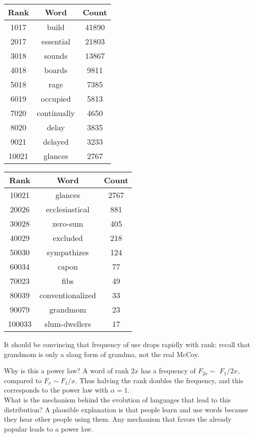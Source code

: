 \documentclass[10pt]{article}
\begin{document}
\begin{center}
\begin{tabular}{c|c|c}
Rank & Word & Count \\
\hline
1017 & build & 41890 \\
2017 & essential & 21803 \\
3018 & sounds & 13867 \\
4018 & boards & 9811 \\
5018 & rage & 7385 \\
6019 & occupied & 5813 \\
7020 & continually & 4650 \\
8020 & delay & 3835 \\
9021 & delayed & 3233 \\
10021 & glances & 2767 \\
\end{tabular}
\end{center}

\begin{center}
\begin{tabular}{c|c|c}
Rank & Word & Count \\
\hline
10021 & glances & 2767 \\
20026 & ecclesiastical & 881 \\
30028 & zero-sum & 405 \\
40029 & excluded & 218 \\
50030 & sympathizes & 124 \\
60034 & capon & 77 \\
70023 & fibs & 49 \\
80039 & conventionalized & 33 \\
90079 & grandmom & 23 \\
100033 & slum-dwellers & 17 \\
\end{tabular}
\end{center}

It should be convincing that frequency of use drops rapidly with rank: recall that grandmom is only a slang form of grandma, not the real McCoy.

Why is this a power law? A word of rank $2 x$ has a frequency of $F_{2 x} \sim$ $F_{1} / 2 x$, compared to $F_{x} \sim F_{1} / x$. Thus halving the rank doubles the frequency, and this corresponds to the power law with $\alpha=1$.\\
What is the mechanism behind the evolution of languages that lead to this distribution? A plausible explanation is that people learn and use words because they hear other people using them. Any mechanism that favors the already popular leads to a power law.
\end{document}
